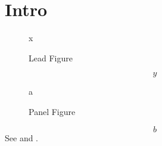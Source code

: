 \section{Intro}
\begin{figure}\caption{Lead Figure}\label{fig:lead}x\end{figure}
\begin{equation}\label{eq:lead}y\end{equation}
\begin{figure}\caption{Panel Figure}\label{fig:panel}a\end{figure}
\begin{equation}\label{eq:panel}b\end{equation}
See  and .
